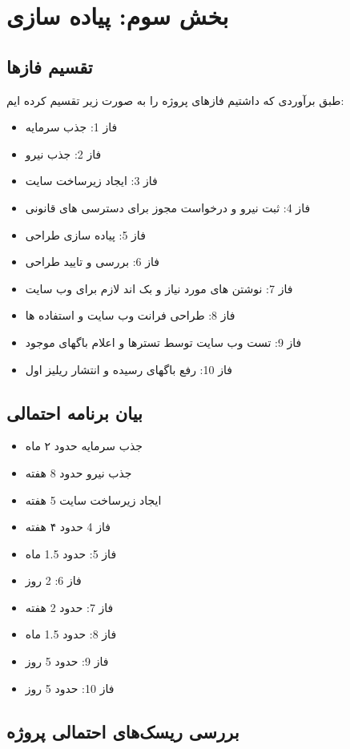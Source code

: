 \documentclass[a4paper]{article}
\begin{document}
		\section{بخش سوم: پیاده سازی}
		\subsection{تقسیم فازها}
		طبق برآوردی که داشتیم فازهای پروژه را به صورت زیر تقسیم کرده ایم:
		\begin{itemize}
			\item فاز 1: جذب سرمایه
			\item فاز 2: جذب نیرو
			\item فاز 3: ایجاد زیرساخت سایت
			\item فاز 4: ثبت نیرو و درخواست مجوز برای دسترسی های قانونی
			\item فاز 5: پیاده سازی طراحی 
			\item فاز 6: بررسی و تایید طراحی
			\item فاز 7: نوشتن  های مورد نیاز و بک اند لازم برای وب سایت
			\item فاز 8: طراحی فرانت وب سایت و استفاده  ها
			\item فاز 9: تست وب سایت توسط تسترها و اعلام باگهای موجود
			\item فاز 10: رفع باگهای رسیده و انتشار ریلیز اول
		\end{itemize}
		
		\subsection{بیان برنامه احتمالی}
		\begin{itemize}
			\item جذب سرمایه حدود ۲ ماه
			\item جذب نیرو حدود 8 هفته
			\item ایجاد زیرساخت سایت 5 هفته
			\item فاز 4 حدود ۴ هفته
			\item فاز 5: حدود 1.5 ماه
			\item فاز 6:   2 روز
			\item فاز 7: حدود 2 هفته
			\item فاز 8: حدود 1.5 ماه
			\item فاز 9: حدود 5 روز
			\item فاز 10: حدود 5 روز
		\end{itemize}
		\subsection{بررسی ریسک‌های احتمالی پروژه}
		
\end{document}
